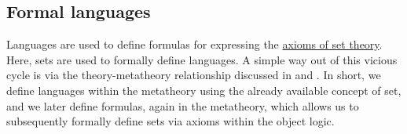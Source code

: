 \subsection{Formal languages}\label{subsec:formal_languages}

\begin{remark}\label{rem:language_definitions_using_sets}
  Languages are used to define formulas for expressing the \hyperref[def:zfc]{axioms of set theory}. Here, sets are used to formally define languages. A simple way out of this vicious cycle is via the theory-metatheory relationship discussed in  and . In short, we define languages within the metatheory using the already available concept of set, and we later define formulas, again in the metatheory, which allows us to subsequently formally define sets via axioms within the object logic.
\end{remark}

